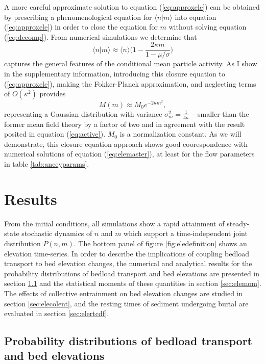 A more careful approximate solution to equation (\ref{eq:approxele}) can be obtained by prescribing a phenomenological equation for $\langle n | m \rangle$ into equation (\ref{eq:approxele}) in order to close the equation for $m$ without solving equation (\ref{eq:decomp}).
From numerical simulations we determine that
\begin{equation}
	\langle n | m  \rangle \approx \langle n \rangle \Big( 1 - \frac{2\kappa m}{1-\mu/\sigma}\Big) \label{eq:closure}
\end{equation}
captures the general features of the conditional mean particle activity.
As I show in the supplementary information, introducing this closure equation to (\ref{eq:approxele}), making the Fokker-Planck approximation, and neglecting terms of $O(\kappa^2)$ provides 
\begin{equation} M(m) \approx M_0 e^{-2\kappa m^2}, \label{eq:ou2}\end{equation}
representing a Gaussian distribution with variance $\sigma_m^2 = \frac{1}{4\kappa}$ -- smaller than the former mean field theory by a factor of two and in agreement with the result posited in equation (\ref{eq:active}).
$M_0$ is a normalization constant. 
As we will demonstrate, this closure equation approach shows good coorespondence with numerical solutions of equation (\ref{eq:elemaster}), at least for the flow parameters in table \ref{tab:anceyparams}.

\section{Results}
\label{sec:eleresults}

From the initial conditions, all simulations show a rapid attainment of steady-state stochastic dynamics of $n$ and $m$ which support a time-independent joint distribution $P(n,m)$. The bottom panel of figure \ref{fig:eledefinition} shows an elevation time-series. In order to describe the implications of coupling bedload transport to bed elevation changes, the numerical and analytical results for the probability distributions of bedload transport and bed elevations are presented in section \ref{sec:elepdf} and the statistical moments of these quantities in section \ref{sec:elemom}. The effects of collective entrainment on bed elevation changes are studied in section \ref{sec:elecolent}, and the resting times of sediment undergoing burial are evaluated in section \ref{sec:elertcdf}.

\subsection{Probability distributions of bedload transport and bed elevations}
\label{sec:elepdf}

